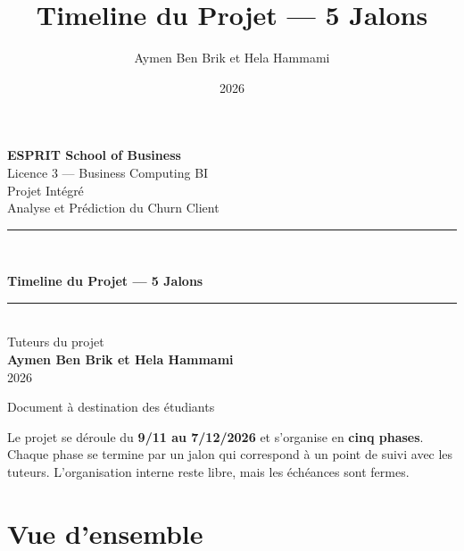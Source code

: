 \documentclass[11pt,a4paper]{article}
\title{\color{primary}\textbf{Timeline du Projet --- 5 Jalons}}
\author{Aymen Ben Brik et Hela Hammami}
\date{2026}
\begin{document}
\begin{titlepage}
\centering
\vspace*{1.5cm}

{\Large\bfseries ESPRIT School of Business}\\[0.3cm]
{\large Licence 3 --- Business Computing BI}\\[2cm]

{\color{gray}\large Projet Intégré}\\[0.3cm]
{\color{gray}\large Analyse et Prédiction du Churn Client}\\[2.2cm]

\rule{0.85\linewidth}{1.2pt}\\[0.6cm]
{\Huge\bfseries\color{primary} Timeline du Projet --- 5 Jalons\par}
\rule{0.85\linewidth}{1.2pt}\\[2cm]

{\large Tuteurs du projet}\\[0.2cm]
{\Large\bfseries Aymen Ben Brik et Hela Hammami}\\[1cm]
{\large 2026}

\vfill
{\color{gray}\small Document à destination des étudiants}
\end{titlepage}

\tableofcontents
\newpage

Le projet se déroule du \textbf{9/11 au 7/12/2026} et s'organise en
\textbf{cinq phases}. Chaque phase se termine par un jalon qui
correspond à un point de suivi avec les tuteurs. L'organisation interne
reste libre, mais les échéances sont fermes.

\section{Vue d'ensemble}\label{vue-densemble}
\end{document}
